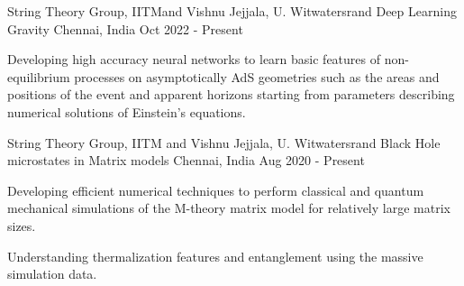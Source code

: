 



\begin{cventries}

  \cventry
    {String Theory Group, IITM\footnotemark[1] and Vishnu Jejjala, U. Witwatersrand} %
    {Deep Learning Gravity} %
    {Chennai, India} %
    {Oct 2022 - Present} %
    {
      \begin{cvitems} %
        \item {Developing high accuracy neural networks to learn basic features of non-equilibrium processes on asymptotically AdS geometries such as the areas and positions of the event and apparent horizons starting from parameters describing numerical solutions of Einstein's equations.}
      \end{cvitems}
    }


  \cventry
    {String Theory Group, IITM and Vishnu Jejjala, U. Witwatersrand} %
    {Black Hole microstates in Matrix models} %
    {Chennai, India} %
    {Aug 2020 - Present} %
    {
      \begin{cvitems} %
        \item {Developing efficient numerical techniques to perform classical and quantum mechanical simulations of the M-theory matrix model for relatively large matrix sizes.}
        \item {Understanding thermalization features and entanglement using the massive simulation data.}
      \end{cvitems}
    }
    

\end{cventries}
